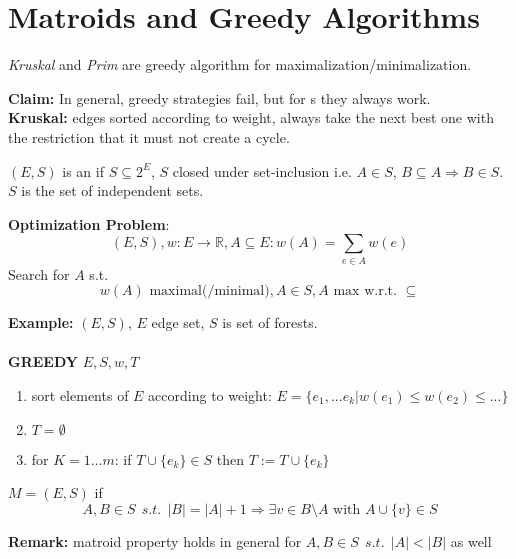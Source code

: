 
\section{Matroids and Greedy Algorithms}

\textit{Kruskal} and \textit{Prim} are greedy algorithm for maximalization/minimalization.

\textbf{Claim:} In general, greedy strategies fail, but for s they always work.\\

\textbf{Kruskal:} edges sorted according to weight, always take the next best one with the restriction that it must not create a cycle.

\begin{definition}
$(E, S)$ is an  if $S \subseteq 2^E$, $S$ closed under set-inclusion i.e. $A\in S$, $B \subseteq A \Rightarrow B\in S$.\\
$S$ is the set of independent sets.
\end{definition}

\textbf{Optimization Problem}:
\[ (E, S), w: E \rightarrow \mathbb{R}, A\subseteq E: w(A) = \sum_{e\in A} w(e)\]
Search for $A$ s.t.
\[ w(A) \text{ maximal(/minimal)}, A\in S, A \text{ max w.r.t. } \subseteq\]

\textbf{Example:} $(E, S)$, $E$ edge set, $S$ is set of forests.\\\\
\textbf{GREEDY} $E, S, w, T$
\begin{enumerate}
	\item{sort elements of $E$ according to weight: $E=\{e_1, ... e_k|w(e_1)\le w(e_2)\le...\}$}
	\item{$T=\emptyset$}
	\item{for $K=1...m$: if $T\cup\{e_k\} \in S $ then $T:= T\cup\{e_k\}$}
\end{enumerate}

\begin{definition}
	$M=(E, S)$   if
	\[
	A, B \in S~~s.t.~~|B|=|A|+1\Rightarrow\exists v\in B\setminus A \text{ with } A\cup\{v\}\in S
	\]
\end{definition}

\textbf{Remark:} matroid property holds in general for $A,B \in S~~s.t.~~|A|<|B|$ as well\\

